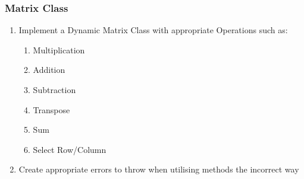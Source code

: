 \begin{flushleft}
            \subsubsection*{Matrix Class}
                \begin{enumerate}
                    \item Implement a Dynamic Matrix Class with appropriate Operations such as:
                        \begin{enumerate}
                            \item Multiplication
                            \item Addition
                            \item Subtraction
                            \item Transpose
                            \item Sum
                            \item Select Row/Column
                        \end{enumerate}
                    \item Create appropriate errors to throw when utilising methods the incorrect way
                \end{enumerate}   

\end{flushleft}

